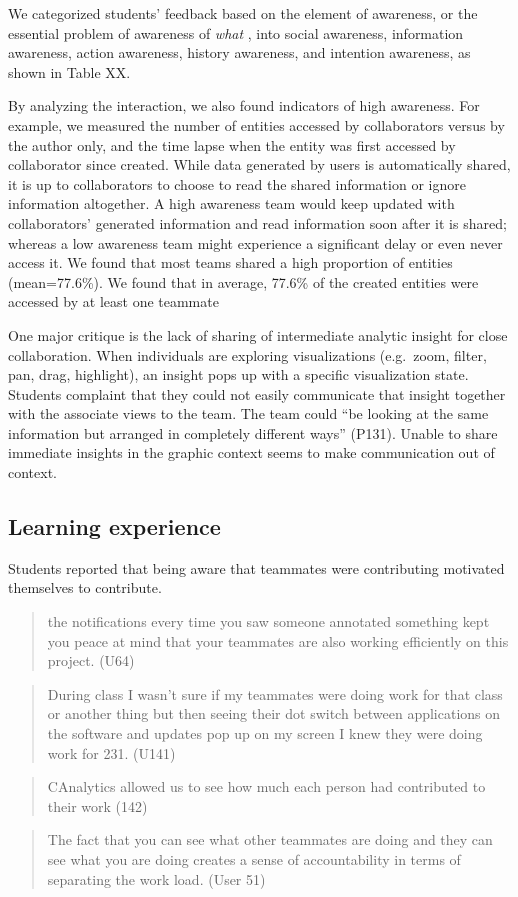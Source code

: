 We categorized students' feedback based on the element of awareness, or
the essential problem of awareness of \emph{what}
\autocite{Schmidt2002}, into social awareness, information awareness,
action awareness, history awareness, and intention awareness, as shown
in Table XX.

By analyzing the interaction, we also found indicators of high
awareness. For example, we measured the number of entities accessed by
collaborators versus by the author only, and the time lapse when the
entity was first accessed by collaborator since created. While data
generated by users is automatically shared, it is up to collaborators to
choose to read the shared information or ignore information altogether.
A high awareness team would keep updated with collaborators' generated
information and read information soon after it is shared; whereas a low
awareness team might experience a significant delay or even never access
it. We found that most teams shared a high proportion of entities
(mean=77.6\%). We found that in average, 77.6\% of the created entities
were accessed by at least one teammate

One major critique is the lack of sharing of intermediate analytic
insight for close collaboration. When individuals are exploring
visualizations (e.g.~zoom, filter, pan, drag, highlight), an insight
pops up with a specific visualization state. Students complaint that
they could not easily communicate that insight together with the
associate views to the team. The team could ``be looking at the same
information but arranged in completely different ways'' (P131). Unable
to share immediate insights in the graphic context seems to make
communication out of context.

\subsection{Learning experience}\label{learning-experience}

Students reported that being aware that teammates were contributing
motivated themselves to contribute.

\begin{quote}
the notifications every time you saw someone annotated something kept
you peace at mind that your teammates are also working efficiently on
this project. (U64)
\end{quote}

\begin{quote}
During class I wasn't sure if my teammates were doing work for that
class or another thing but then seeing their dot switch between
applications on the software and updates pop up on my screen I knew they
were doing work for 231. (U141)
\end{quote}

\begin{quote}
CAnalytics allowed us to see how much each person had contributed to
their work (142)
\end{quote}

\begin{quote}
The fact that you can see what other teammates are doing and they can
see what you are doing creates a sense of accountability in terms of
separating the work load. (User 51)
\end{quote}